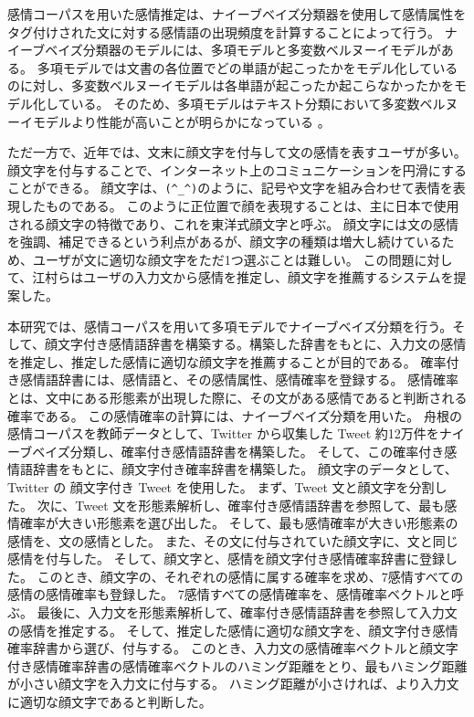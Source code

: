 \documentclass[11pt,a4j]{jsarticle}
\begin{document}
感情コーパスを用いた感情推定は、ナイーブベイズ分類器を使用して感情属性をタグ付けされた文に対する感情語の出現頻度を計算することによって行う。
ナイーブベイズ分類器のモデルには、多項モデルと多変数ベルヌーイモデルがある。
多項モデルでは文書の各位置でどの単語が起こったかをモデル化しているのに対し、多変数ベルヌーイモデルは各単語が起こったか起こらなかったかをモデル化している。
そのため、多項モデルはテキスト分類において多変数ベルヌーイモデルより性能が高いことが明らかになっている 。

ただ一方で、近年では、文末に顔文字を付与して文の感情を表すユーザが多い。
顔文字を付与することで、インターネット上のコミュニケーションを円滑にすることができる。
顔文字は、\verb|(^_^)|のように、記号や文字を組み合わせて表情を表現したものである。
このように正位置で顔を表現することは、主に日本で使用される顔文字の特徴であり、これを東洋式顔文字と呼ぶ。
顔文字には文の感情を強調、補足できるという利点があるが、顔文字の種類は増大し続けているため、ユーザが文に適切な顔文字をただ1つ選ぶことは難しい。
この問題に対して、江村らはユーザの入力文から感情を推定し、顔文字を推薦するシステムを提案した。


本研究では、感情コーパスを用いて多項モデルでナイーブベイズ分類を行う。そして、顔文字付き感情語辞書を構築する。構築した辞書をもとに、入力文の感情を推定し、推定した感情に適切な顔文字を推薦することが目的である。
確率付き感情語辞書には、感情語と、その感情属性、感情確率を登録する。
感情確率とは、文中にある形態素が出現した際に、その文がある感情であると判断される確率である。
この感情確率の計算には、ナイーブベイズ分類を用いた。
舟根の感情コーパスを教師データとして、Twitter から収集した Tweet 約12万件をナイーブベイズ分類し、確率付き感情語辞書を構築した。
そして、この確率付き感情語辞書をもとに、顔文字付き確率辞書を構築した。
顔文字のデータとして、Twitter の 顔文字付き Tweet を使用した。
まず、Tweet 文と顔文字を分割した。
次に、Tweet 文を形態素解析し、確率付き感情語辞書を参照して、最も感情確率が大きい形態素を選び出した。
そして、最も感情確率が大きい形態素の感情を、文の感情とした。
また、その文に付与されていた顔文字に、文と同じ感情を付与した。
そして、顔文字と、感情を顔文字付き感情確率辞書に登録した。
このとき、顔文字の、それぞれの感情に属する確率を求め、7感情すべての感情の感情確率も登録した。
7感情すべての感情確率を、感情確率ベクトルと呼ぶ。
最後に、入力文を形態素解析して、確率付き感情語辞書を参照して入力文の感情を推定する。
そして、推定した感情に適切な顔文字を、顔文字付き感情確率辞書から選び、付与する。
このとき、入力文の感情確率ベクトルと顔文字付き感情確率辞書の感情確率ベクトルのハミング距離をとり、最もハミング距離が小さい顔文字を入力文に付与する。
ハミング距離が小さければ、より入力文に適切な顔文字であると判断した。
\end{document}
